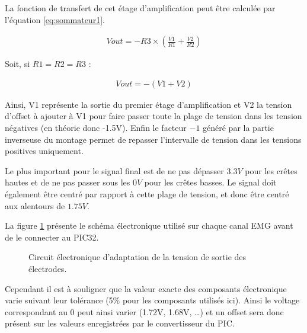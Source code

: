\documentclass[letterpaper, twoside, 12pt, memoire, creativecommons, hyperref]{thETS}
\begin{document}
La fonction de transfert de cet étage d'amplification peut être calculée par l'équation \ref{eq:sommateur1}. 

\begin{align}\label{eq:sommateur1}
   Vout = -R3 \times ( \frac{V1}{R1} + \frac{V2}{R2})
\end{align}

Soit, si $R1 = R2 = R3$ : 

\begin{align}\label{eq:sommateur2}
   Vout = -(V1 + V2)
\end{align}

Ainsi, V1 représente la sortie du premier étage d'amplification et V2 la tension d'offset à ajouter à V1 pour faire passer toute la plage de tension dans les tension négatives (en théorie donc -1.5V). Enfin le facteur $-1$ généré par la partie inverseuse du montage permet de repasser l'intervalle de tension dans les tensions positives uniquement.

Le plus important pour le signal final est de ne pas dépasser $3.3V$ pour les crêtes hautes et de ne pas passer sous les $0V$ pour les crêtes basses. Le signal doit également être centré par rapport à cette plage de tension, et donc être centré aux alentours de $1.75V$.

La figure \ref{fig:adapttension} présente le schéma électronique utilisé sur chaque canal EMG avant de le connecter au PIC32.

\begin{figure}
	\centering
	\caption{Circuit électronique d'adaptation de la tension de sortie des électrodes.}
	\label{fig:adapttension}
\end{figure}

Cependant il est à souligner que la valeur exacte des composants électronique varie suivant leur tolérance (5\% pour les composants utilisés ici). Ainsi le voltage correspondant au 0 peut ainsi varier (1.72V, 1.68V, …) et un offset sera donc présent sur les valeurs enregistrées par le convertisseur du PIC. 
\end{document}
